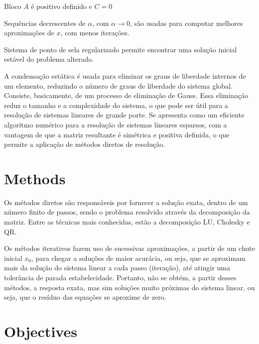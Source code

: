 \documentclass[12pt]{article}
\begin{document}
Bloco \(A\) é positivo definido e \(C=0\)

Sequências decrescentes de \(\alpha{}\), com \(\alpha{} \rightarrow{} 0\), são usadas para computar melhores aproximações de \(x\), 
com menos iterações.


Sistema de ponto de sela regularizado permite encontrar uma solução inicial estável do problema alterado.

A condensação estática é usada para eliminar os graus de liberdade internos de um elemento, reduzindo o número de graus de liberdade do sistema global. Consiste, basicamente, de um processo de eliminação de Gauss.
Essa eliminação reduz o tamanho e a complexidade do sistema, o que pode ser útil para a resolução de sistemas lineares de grande porte.
Se apresenta como um eficiente algoritmo numérico para a resolução de sistemas lineares esparsos, com a vantagem de que a matriz resultante é 
simétrica e positiva definida, o que permite a aplicação de métodos diretos de resolução.



\section{Methods}

Os métodos diretos são responsáveis por fornecer a solução exata, dentro de um número finito de passos, sendo o problema resolvido através da decomposição da matriz. 
Entre as técnicas mais conhecidas, estão a decomposição LU, Cholesky e QR.

Os métodos iterativos fazem uso de sucessivas aproximações, a partir de um chute inicial \(x_0\), para chegar a soluções de maior acurácia, ou seja, 
que se aproximam mais da solução do sistema linear a cada passo (iteração), até atingir uma tolerância de parada estabelecidade. Portanto, não se obtém, 
a partir desses métodos, a resposta exata, mas sim soluções muito próximas do sistema linear, ou seja, que o resíduo das equações se aproxime de zero. 

\section{Objectives}
\end{document}
